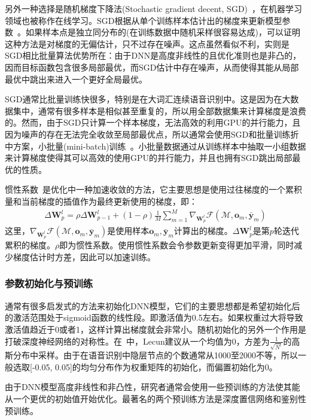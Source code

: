 另外一种选择是随机梯度下降法(Stochastic gradient decent, SGD)~\cite{bottou1998online}，在机器学习领域也被称作在线学习。SGD根据从单个训练样本估计出的梯度来更新模型参数~\cite{yu2010roles}。如果样本点是独立同分布的(在训练数据中随机采样很容易达成)，可以证明这种方法是对梯度的无偏估计，只不过存在噪声。这点虽然看似不利，实则是SGD相比批量算法优势所在：由于DNN是高度非线性的且优化准则也是非凸的，因而目标函数包含很多局部最优，而SGD估计中存在噪声，从而使得其能从局部最优中跳出来进入一个更好全局最优。

SGD通常比批量训练快很多，特别是在大词汇连续语音识别中。这是因为在大数据集中，通常有很多样本是相似甚至重复的，所以用全部数据集来计算梯度是浪费的。然而，由于SGD只计算一个样本梯度，无法高效的利用GPU的并行能力，且因为噪声的存在无法完全收敛至局部最优点，所以通常会使用SGD和批量训练折中方案，小批量(mini-batch)训练~\cite{yu2010roles}。小批量数据通过从训练样本中抽取一小组数据来计算梯度使得其可以高效的使用GPU的并行能力，并且也拥有SGD跳出局部最优的性质。

惯性系数~\cite{polyak1964some}是优化中一种加速收敛的方法，它主要思想是使用过往梯度的一个累积量和当前梯度的插值作为最终更新使用的梯度，即：
\begin{eqnarray}
    \Delta\mathbf{W}^l_p = \rho \Delta \mathbf{W}^l_{p-1} + (1-\rho) \frac{1}{M} \sum_{m=1}^M \nabla_{\mathbf{W}^l_p} \mathcal{F}(\mathcal{M}, \mathbf{o}_m, \bar{\mathbf{y}}_m)
\end{eqnarray}
这里，$\nabla_{\mathbf{W}^l_p} \mathcal{F}(\mathcal{M}, \mathbf{o}_m, \bar{\mathbf{y}}_m)$是使用样本$\mathbf{o}_m, \bar{\mathbf{y}}_m$计算出的梯度。$\Delta\mathbf{W}^l_p$是第$p$轮迭代累积的梯度。$\rho$即为惯性系数。使用惯性系数会令参数更新变得更加平滑，同时减少梯度估计时方差，因此可以加速训练。

\subsubsection{参数初始化与预训练}
通常有很多启发式的方法来初始化DNN模型，它们的主要思想都是希望初始化后的激活范围处于sigmoid函数的线性段。即激活值为0.5左右。如果权重过大将导致激活值趋近于0或者1，这样计算出梯度就会非常小。随机初始化的另外一个作用是打破深度神经网络的对称性。在~\cite{lecun1998efficient}中，Lecun建议从一个均值为0，方差为$\frac{1}{\sqrt{N^l}}$的高斯分布中采样。由于在语音识别中隐层节点的个数通常从1000至2000不等，所以一般选取[-0.05, 0.05]的均匀分布作为权重矩阵的初始化，而偏置初始化为0。

由于DNN模型高度非线性和非凸性，研究者通常会使用一些预训练的方法使其能从一个更优的初始值开始优化。最著名的两个预训练方法是深度置信网络和鉴别性预训练。

